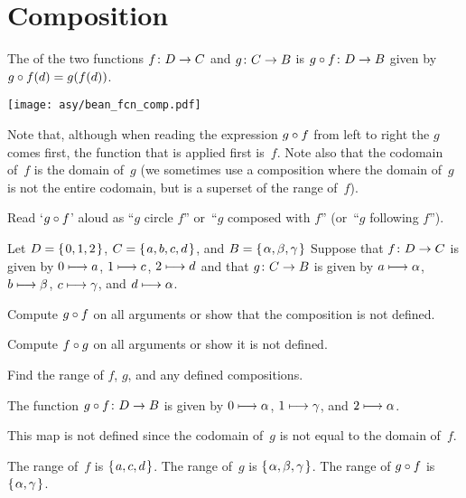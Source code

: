 \documentclass{ibl}
\begin{document}
\section{Composition}

\begin{df}
The  of
the two functions
$\mbox{$f\colon D\to C$}$ and $\mbox{$g\colon C\to B$}$ 
is $\mbox{$g\mathbin{\circ} f\colon D\to B$}$ given by 
$g\mathbin{\circ} f(d)=g(f(d))$.
\end{df}

\begin{center}
  \texttt{[image: asy/bean\_fcn\_comp.pdf]}  
\end{center}

Note that, 
although when reading the expression $g\mathbin{\circ} f$ from left to right 
the $g$ comes first, 
the function that is applied first is~$f$. 
Note also that the codomain of~$f$ is the domain of~$g$
(we sometimes use a composition where the domain of~$g$ is not the 
entire codomain, but is a superset of the range of~$f$).

Read `$g\mathbin{\circ} f$' aloud as ``$g$ circle $f$'' 
or~``$g$ composed with $f$''
(or~``$g$ following $f$'').

\begin{ex} Let $D=\mbox{$\{\hspace{0.1em}0,1,2\hspace{0.1em}\}$}$, $C=\mbox{$\{\hspace{0.1em}a,b,c,d\hspace{0.1em}\}$}$, 
and $B=\mbox{$\{\hspace{0.1em}\alpha,\beta,\gamma\hspace{0.1em}\}$}$
Suppose that $\mbox{$f\colon D\to C$}$ is given by $0\stackrel{}{\longmapsto} a$, $1\stackrel{}{\longmapsto} c$, 
$2\stackrel{}{\longmapsto} d$ and that $\mbox{$g\colon C\to B$}$
is given by 
$a\stackrel{}{\longmapsto}\alpha$, $b\stackrel{}{\longmapsto} \beta$, $c\stackrel{}{\longmapsto}\gamma$,
and $d\stackrel{}{\longmapsto}\alpha$.
\begin{exes}
\item Compute $g\mathbin{\circ} f$ on all arguments or show that the composition
  is not defined.
\item Compute $f\mathbin{\circ} g$ on all arguments or show it is not defined.
\item Find the range of $f$, $g$, and any defined compositions.    
\end{exes}
\begin{ans}
\begin{exes}
\item The function $\mbox{$g\mathbin{\circ} f\colon D\to B$}$ is given by 
  $0\stackrel{}{\longmapsto}\alpha$, $1\stackrel{}{\longmapsto}\gamma$, and $2\stackrel{}{\longmapsto}\alpha$.
\item This map is not defined since the codomain of~$g$ is not equal to 
  the domain of~$f$.
\item The range of~$f$ is $\mbox{$\{\hspace{0.1em}a,c,d\hspace{0.1em}\}$}$.
  The range of~$g$ is $\mbox{$\{\hspace{0.1em}\alpha,\beta,\gamma\hspace{0.1em}\}$}$. 
  The range of $g\mathbin{\circ} f$ is $\mbox{$\{\hspace{0.1em}\alpha,\gamma\hspace{0.1em}\}$}$.
\end{exes}
\end{ans}
\end{ex}
\end{document}
